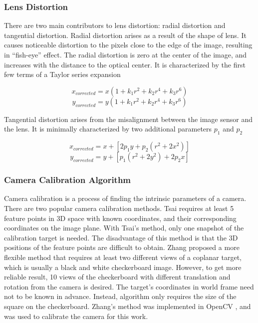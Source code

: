 \subsubsection{Lens Distortion}
There are two main contributors to lens distortion: radial distortion
and tangential distortion. Radial distortion arises as a result of the
shape of lens. It causes noticeable distortion to the pixels close to
the edge of the image, resulting in ``fish-eye'' effect. The radial
distortion is zero at the center of the image, and increases with the
distance to the optical center. It is characterized by the first few
terms of a Taylor series expansion \cite{bradski_learning_2008}

$$ x_{corrected} = x(1+k_1r^2+k_2r^4+k_3r^6)$$
$$ y_{corrected} = y(1+k_1r^2+k_2r^4+k_3r^6)$$

\noindent Tangential distortion arises from the misalignment between
the image sensor and the lens. It is minimally characterized by two
additional parameters $p_1$ and $p_2$ \cite{bradski_learning_2008}

$$x_{corrected} = x+[2p_1y+p_2(r^2+2x^2)]$$
$$y_{corrected} = y+[p_1(r^2+2y^2)+2p_2x]$$

\subsubsection{Camera Calibration Algorithm}
Camera calibration is a process of finding the intrinsic parameters of
a camera. There are two popular camera calibration methods. Tsai
\cite{tsai_efficient_1986} requires at least 5 feature points in 3D
space with known coordinates, and their corresponding coordinates on
the image plane. With Tsai's method, only one snapshot of the
calibration target is needed. The disadvantage of this method is that
the 3D positions of the feature points are difficult to obtain. Zhang
\cite{zhang_flexible_2000} proposed a more flexible method that
requires at least two different views of a coplanar target, which is
usually a black and white checkerboard image. However, to get more
reliable result, 10 views of the checkerboard with different
translation and rotation from the camera is desired. The target's
coordinates in world frame need not to be known in advance. Instead,
algorithm only requires the size of the square on the checkerboard.
Zhang's method was implemented in OpenCV \cite{bradski_learning_2008},
and was used to calibrate the camera for this work.

